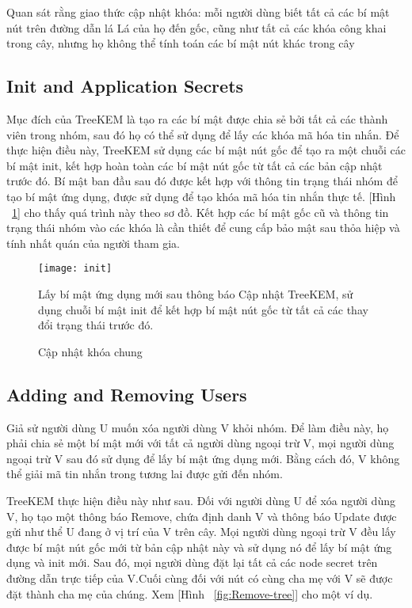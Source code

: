 \documentclass[../main-report.tex]{subfiles}
\begin{document}
Quan sát rằng giao thức cập nhật khóa: mỗi người dùng biết tất cả các bí mật nút trên đường dẫn lá Lá của họ đến gốc, cũng như tất cả các khóa công khai trong cây, nhưng họ không thể tính toán các bí mật nút khác trong cây


\subsection{Init and Application Secrets}
Mục đích của TreeKEM là tạo ra các bí mật được chia sẻ bởi tất cả các thành viên trong nhóm, sau đó họ có thể sử dụng để lấy các khóa mã hóa tin nhắn. Để thực hiện điều này, TreeKEM sử dụng các bí mật nút gốc để tạo ra một chuỗi các bí mật init, kết hợp hoàn toàn các bí mật nút gốc từ tất cả các bản cập nhật trước đó. Bí mật ban đầu sau đó được kết hợp với thông tin trạng thái nhóm để tạo bí mật ứng dụng, được sử dụng để tạo khóa mã hóa tin nhắn thực tế. [Hình ~\ref{fig:init}] cho thấy quá trình này theo sơ đồ. Kết hợp các bí mật gốc cũ và thông tin trạng thái nhóm vào các khóa là cần thiết để cung cấp bảo mật sau thỏa hiệp và tính nhất quán của người tham gia.

\begin{figure}[!h]
\begin{center}
\label{fig:init}
\texttt{[image: init]}
\caption{Cập nhật khóa chung}
{Lấy bí mật ứng dụng mới sau thông báo Cập nhật TreeKEM, sử dụng chuỗi bí mật init để kết hợp bí mật nút gốc từ tất cả các thay đổi trạng thái trước đó.}
\end{center}
\end{figure}


\subsection{Adding and Removing Users}
Giả sử người dùng U muốn xóa người dùng V khỏi nhóm. Để làm điều này, họ phải chia sẻ một bí mật mới với tất cả người dùng ngoại trừ V, mọi người dùng ngoại trừ V sau đó sử dụng để lấy bí mật ứng dụng mới. Bằng cách đó, V không thể giải mã tin nhắn trong tương lai được gửi đến nhóm.

TreeKEM thực hiện điều này như sau. Đối với người dùng U để xóa người dùng V, họ tạo một thông báo \gls{Remove}, chứa định danh V và thông báo \gls{Update} được gửi như thể U đang ở vị trí của V trên cây. Mọi người dùng ngoại trừ V đều lấy được bí mật nút gốc mới từ bản cập nhật này và sử dụng nó để lấy bí mật ứng dụng và init mới. Sau đó, mọi người dùng đặt lại tất cả các node secret trên đường dẫn trực tiếp của V.Cuối cùng đối với nút có cùng cha mẹ với V sẽ được đặt thành cha mẹ của chúng. Xem [Hình ~\ref{fig:Remove-tree}] cho một ví dụ.
\end{document}
